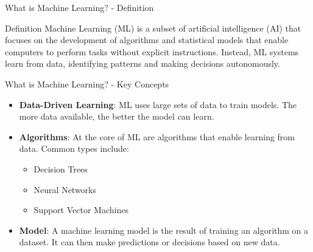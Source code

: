 \documentclass[aspectratio=169]{beamer}
\begin{document}
\begin{frame}[fragile]{What is Machine Learning? - Definition}
    \begin{block}{Definition}
        Machine Learning (ML) is a subset of artificial intelligence (AI) that focuses on the development of algorithms and statistical models that enable computers to perform tasks without explicit instructions. Instead, ML systems learn from data, identifying patterns and making decisions autonomously.
    \end{block}
\end{frame}

\begin{frame}[fragile]{What is Machine Learning? - Key Concepts}
    \begin{itemize}
        \item \textbf{Data-Driven Learning}: ML uses large sets of data to train models. The more data available, the better the model can learn.
        \item \textbf{Algorithms}: At the core of ML are algorithms that enable learning from data. Common types include:
        \begin{itemize}
            \item Decision Trees
            \item Neural Networks
            \item Support Vector Machines
        \end{itemize}
        \item \textbf{Model}: A machine learning model is the result of training an algorithm on a dataset. It can then make predictions or decisions based on new data.
    \end{itemize}
\end{frame}
\end{document}
